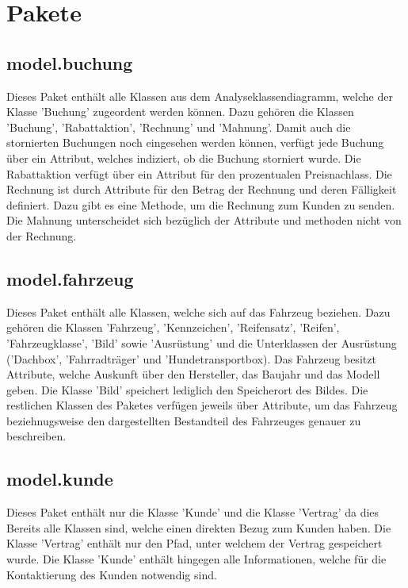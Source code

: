 \newpage

\section{Pakete}

\subsection{model.buchung}

Dieses Paket enthält alle Klassen aus dem Analyseklassendiagramm, welche der Klasse 'Buchung' zugeordent werden können. Dazu gehören die Klassen 'Buchung', 'Rabattaktion', 'Rechnung' und 'Mahnung'. Damit auch die stornierten Buchungen noch eingesehen werden können, verfügt jede Buchung über ein Attribut, welches indiziert, ob die Buchung storniert wurde. Die Rabattaktion verfügt über ein Attribut für den prozentualen Preisnachlass. Die Rechnung ist durch Attribute für den Betrag der Rechnung und deren Fälligkeit definiert. Dazu gibt es eine Methode, um die Rechnung zum Kunden zu senden. Die Mahnung unterscheidet sich bezüglich der Attribute und methoden nicht von der Rechnung.

\subsection{model.fahrzeug}

Dieses Paket enthält alle Klassen, welche sich auf das Fahrzeug beziehen. Dazu gehören die Klassen 'Fahrzeug', 'Kennzeichen', 'Reifensatz', 'Reifen', 'Fahrzeugklasse', 'Bild' sowie 'Ausrüstung' und die Unterklassen der Ausrüstung ('Dachbox', 'Fahrradträger' und 'Hundetransportbox).
Das Fahrzeug besitzt Attribute, welche Auskunft über den Hersteller, das Baujahr und das Modell geben. Die Klasse 'Bild' speichert lediglich den Speicherort des Bildes. Die restlichen Klassen des Paketes verfügen jeweils über Attribute, um das Fahrzeug beziehnugsweise den dargestellten Bestandteil des Fahrzeuges genauer zu beschreiben. 

\subsection{model.kunde}

Dieses Paket enthält nur die Klasse 'Kunde' und die Klasse 'Vertrag' da dies Bereits alle Klassen sind, welche einen direkten Bezug zum Kunden haben.
Die Klasse 'Vertrag' enthält nur den Pfad, unter welchem der Vertrag gespeichert wurde. Die Klasse 'Kunde' enthält hingegen alle Informationen, welche für die Kontaktierung des Kunden notwendig sind.

